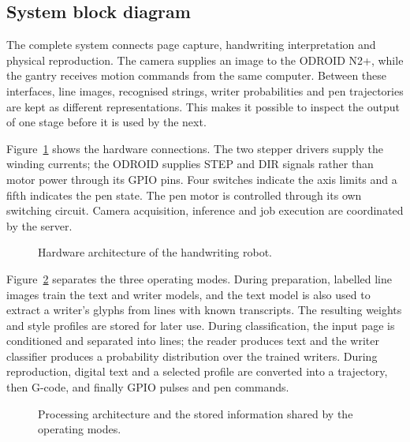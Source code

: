 \subsection{System block diagram}
\label{sec:des-system}
The complete system connects page capture, handwriting interpretation and physical reproduction. The camera supplies an image to the ODROID N2+, while the gantry receives motion commands from the same computer. Between these interfaces, line images, recognised strings, writer probabilities and pen trajectories are kept as different representations. This makes it possible to inspect the output of one stage before it is used by the next.~\cite[web/server.py]{braunepipeline2026}


Figure~\ref{fig:des-hardware-system} shows the hardware connections. The two stepper drivers supply the winding currents; the ODROID supplies STEP and DIR signals rather than motor power through its GPIO pins. Four switches indicate the axis limits and a fifth indicates the pen state. The pen motor is controlled through its own switching circuit. Camera acquisition, inference and job execution are coordinated by the server.~\cite[project implementation]{braunepipeline2026}


\begin{figure}[!htbp]\centering
{}
\caption{Hardware architecture of the handwriting robot.~\cite{brauneevidence2026,braunepipeline2026}}
\label{fig:des-hardware-system}
\end{figure}

Figure~\ref{fig:des-processing-system} separates the three operating modes. During preparation, labelled line images train the text and writer models, and the text model is also used to extract a writer's glyphs from lines with known transcripts. The resulting weights and style profiles are stored for later use. During classification, the input page is conditioned and separated into lines; the reader produces text and the writer classifier produces a probability distribution over the trained writers. During reproduction, digital text and a selected profile are converted into a trajectory, then G-code, and finally GPIO pulses and pen commands.~\cite[project implementation]{braunepipeline2026}


\begin{figure}[!htbp]\centering
{}
\caption{Processing architecture and the stored information shared by the operating modes.~\cite{brauneevidence2026,braunepipeline2026}}
\label{fig:des-processing-system}
\end{figure}


